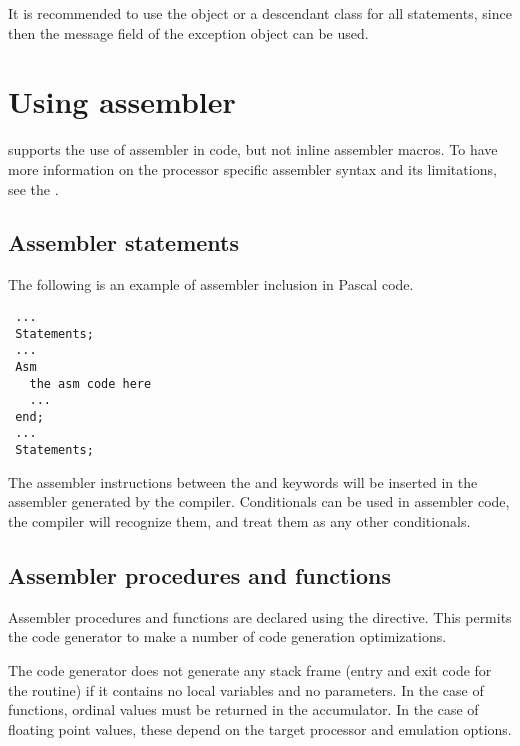 It is recommended to use the  object or a descendant class
for all  statements, since then the message
field of the exception object can be used.

\chapter{Using assembler}
\fpc supports the use of assembler in code, but not inline
assembler macros.  To have more information on the processor
specific assembler syntax and its limitations, see the \progref.

\section{Assembler statements }
  
The following is an example of assembler inclusion in Pascal code.
\begin{verbatim}
 ...
 Statements;
 ...
 Asm
   the asm code here
   ...
 end;
 ...
 Statements;
\end{verbatim}
The assembler instructions between the  and  keywords will
be inserted in the assembler generated by the compiler.
Conditionals can be used in assembler code, the compiler will recognize them,
and treat them as any other conditionals.

\section{Assembler procedures and functions}
  
Assembler procedures and functions are declared using the
 directive.  This permits the code generator to make a number
of code generation optimizations.

The code generator does not generate any stack frame (entry and exit
code for the routine) if it contains no local variables and no
parameters. In the case of functions, ordinal values must be returned
in the accumulator. In the case of floating point values, these depend
on the target processor and emulation options.


%
%
\printindex

